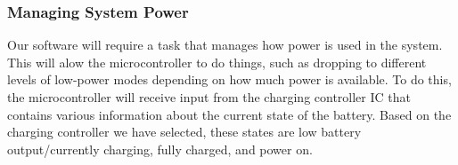 \subsubsection{Managing System Power}
Our software will require a task that manages how power is used in the system. This will alow the microcontroller to do things, such as dropping to different levels of low-power modes depending on how much power is available. To do this, the microcontroller will receive input from the charging controller IC that contains various information about the current state of the battery. Based on the charging controller we have selected, these states are low battery output/currently charging, fully charged, and power on.